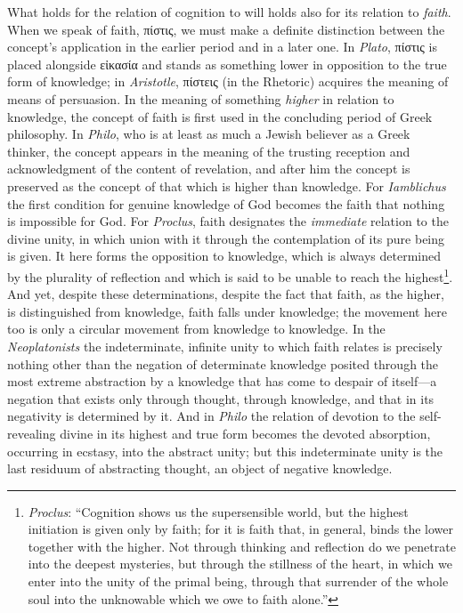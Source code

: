 \documentclass[12pt,a4paper]{book}
\begin{document}
What holds for the relation of cognition to will holds also for its
relation to \emph{faith}. When we speak of faith, πίστις, we must make a definite
distinction between the concept's application in the earlier period and
in a later one. In \emph{Plato}, πίστις is placed alongside
εἰκασία and stands as something lower in opposition to the true
form of knowledge; in \emph{Aristotle}, πίστεις (in the
Rhetoric) acquires the meaning of means of persuasion. In the
meaning of something \emph{higher} in relation to knowledge, the concept of
faith is first used in the concluding period of Greek philosophy. In
\emph{Philo}, who is at least as much a Jewish believer as a Greek thinker, the
concept appears in the meaning of the trusting reception and
acknowledgment of the content of revelation, and after him the concept
is preserved as the concept of that which is higher than knowledge. For
\emph{Iamblichus} the first condition for genuine knowledge of God becomes the
faith that nothing is impossible for God. For \emph{Proclus}, faith designates
the \emph{immediate} relation to the divine unity, in which union with it
through the contemplation of its pure being is given. It here forms the
opposition to knowledge, which is always determined by the plurality of
reflection and which is said to be unable to reach the highest\footnote{\emph{Proclus}: ``Cognition shows us
the supersensible world, but the highest initiation is given only by faith; for it
is faith that, in general, binds the lower together with the higher. Not through
thinking and reflection do we penetrate into the deepest mysteries, but through
the stillness of the heart, in which we enter into the unity of the primal being, through that
surrender of the whole soul into the unknowable which we owe to faith alone.''}. And yet,
despite these determinations, despite the fact that faith, as the
higher, is distinguished from knowledge, faith falls under knowledge;
the movement here too is only a circular movement from knowledge to
knowledge. In the \emph{Neoplatonists} the indeterminate, infinite unity to
which faith relates is precisely nothing other than the negation of
determinate knowledge posited through the most extreme abstraction by a
knowledge that has come to despair of itself---a negation that exists
only through thought, through knowledge, and that in its negativity is
determined by it. And in \emph{Philo} the relation of devotion to the
self-revealing divine in its highest and true form becomes the devoted
absorption, occurring in ecstasy, into the abstract unity; but this
indeterminate unity is the last residuum of abstracting thought, an
object of negative knowledge.
\end{document}
